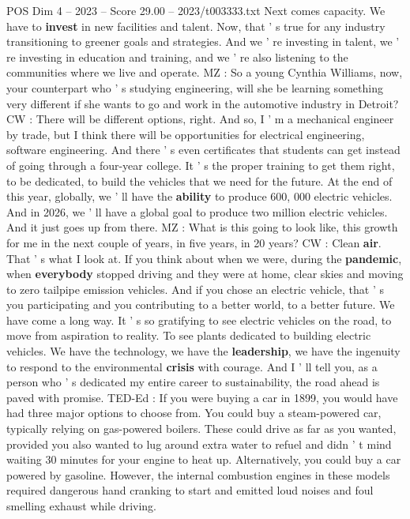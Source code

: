 \begin{textsample}{POS Dim 4 – 2023 – Score 29.00 – 2023/t003333.txt}
Next comes capacity.
We have to \textbf{invest} in new facilities and talent.
Now, that ' s true for any industry transitioning to greener goals and strategies.
And we ' re investing in talent, we ' re investing in education and training, and we ' re also listening to the communities where we live and operate.
MZ : So a young Cynthia Williams, now, your counterpart who ' s studying engineering, will she be learning something very different if she wants to go and work in the automotive industry in Detroit?
CW : There will be different options, right.
And so, I ' m a mechanical engineer by trade, but I think there will be opportunities for electrical engineering, software engineering.
And there ' s even certificates that students can get instead of going through a four-year college.
It ' s the proper training to get them right, to be dedicated, to build the vehicles that we need for the future.
At the end of this year, globally, we ' ll have the \textbf{ability} to produce 600, 000 electric vehicles.
And in 2026, we ' ll have a global goal to produce two million electric vehicles.
And it just goes up from there.
MZ : What is this going to look like, this growth for me in the next couple of years, in five years, in 20 years?
CW : Clean \textbf{air}.
That ' s what I look at.
If you think about when we were, during the \textbf{pandemic}, when \textbf{everybody} stopped driving and they were at home, clear skies and moving to zero tailpipe emission vehicles.
And if you chose an electric vehicle, that ' s you participating and you contributing to a better world, to a better future.
We have come a long way.
It ' s so gratifying to see electric vehicles on the road, to move from aspiration to reality.
To see plants dedicated to building electric vehicles.
We have the technology, we have the \textbf{leadership}, we have the ingenuity to respond to the environmental \textbf{crisis} with courage.
And I ' ll tell you, as a person who ' s dedicated my entire career to sustainability, the road ahead is paved with promise.
TED-Ed : If you were buying a car in 1899, you would have had three major options to choose from.
You could buy a steam-powered car, typically relying on gas-powered boilers.
These could drive as far as you wanted, provided you also wanted to lug around extra water to refuel and didn ' t mind waiting 30 minutes for your engine to heat up.
Alternatively, you could buy a car powered by gasoline.
However, the internal combustion engines in these models required dangerous hand cranking to start and emitted loud noises and foul smelling exhaust while driving.

\end{textsample}
